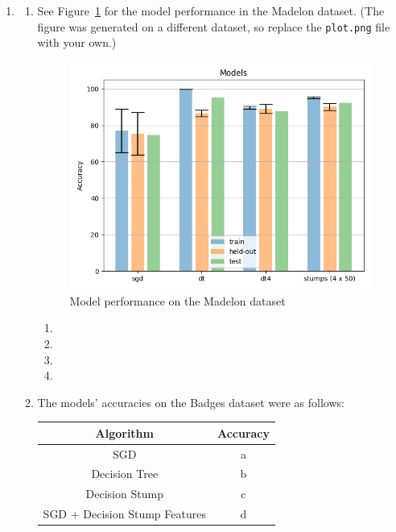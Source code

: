 \documentclass{article}
\begin{document}
\begin{enumerate}
        \item %
        \begin{enumerate}
            \item %
            See Figure~\ref{fig:model_performance} for the model performance in the Madelon dataset. (The figure was generated on a different dataset, so replace the \texttt{plot.png} file with your own.)
            \begin{figure}[H]
                \centering
                \includegraphics[scale=0.75]{plot.png}
                \caption{Model performance on the Madelon dataset}
                \label{fig:model_performance}
            \end{figure}

            \begin{enumerate}[1.]
                \item
                \item
                \item
                \item
            \end{enumerate}

            \item %
            The models' accuracies on the Badges dataset were as follows:
            \begin{center}
                \begin{tabular}{|c|c|}
                    \hline
                    Algorithm & Accuracy \\
                    \hline
                    SGD & a \\
                    Decision Tree & b \\
                    Decision Stump & c \\
                    SGD + Decision Stump Features & d \\
                    \hline
                \end{tabular}
            \end{center}


\end{enumerate}
\end{enumerate}
\end{document}
